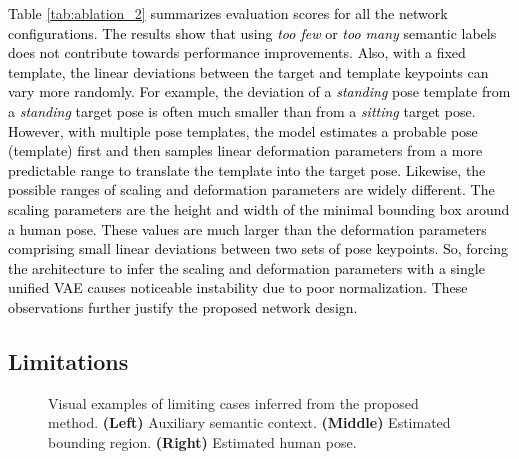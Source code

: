 \textcolor{black}{Table \ref{tab:ablation_2} summarizes evaluation scores for all the network configurations. The results show that using \emph{too few} or \emph{too many} semantic labels does not contribute towards performance improvements. Also, with a fixed template, the linear deviations between the target and template keypoints can vary more randomly. For example, the deviation of a \emph{standing} pose template from a \emph{standing} target pose is often much smaller than from a \emph{sitting} target pose. However, with multiple pose templates, the model estimates a probable pose (template) first and then samples linear deformation parameters from a more predictable range to translate the template into the target pose. Likewise, the possible ranges of scaling and deformation parameters are widely different. The scaling parameters are the height and width of the minimal bounding box around a human pose. These values are much larger than the deformation parameters comprising small linear deviations between two sets of pose keypoints. So, forcing the architecture to infer the scaling and deformation parameters with a single unified VAE causes noticeable instability due to poor normalization. These observations further justify the proposed network design.}

\subsection{Limitations}
\label{sec:experiments_limitations}

\begin{figure}[t]
\centering
\captionsetup[subfloat]{labelfont=bf}
\hfil
{}\hfil
{}
\vspace{-0.75em}
\hfil
{}\hfil
{}
\vspace{-0.75em}
\hfil
{}\hfil
{}
\caption{Visual examples of limiting cases inferred from the proposed method. \textbf{(Left)} Auxiliary semantic context. \textbf{(Middle)} Estimated bounding region. \textbf{(Right)} Estimated human pose.}
\label{fig:limitations}
\end{figure}

